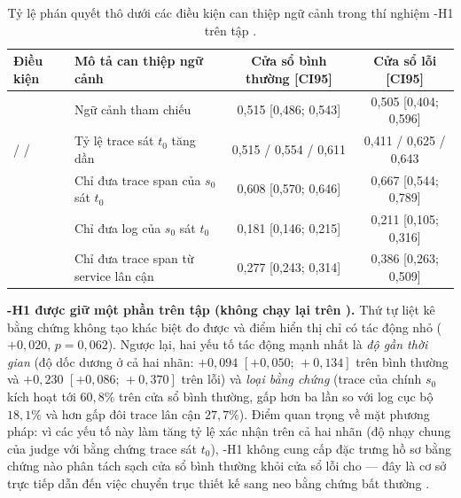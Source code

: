 \begin{table}[H]
  \centering
  \caption[Tỷ lệ TRUE\_ALERT thô theo điều kiện can thiệp H1 trên tập val]{Tỷ lệ phán quyết  thô dưới các điều kiện can thiệp ngữ cảnh trong thí nghiệm \hyp{H1} trên tập .}
  \label{tab:ch5-h1}
  \tblfont
  \tblsetup
  \setlength{\tabcolsep}{4pt}
  \begin{tabularx}{\linewidth}{|l|Y|c|c|}
    \hline
    \textbf{Điều kiện} & \textbf{Mô tả can thiệp ngữ cảnh} & \textbf{Cửa sổ bình thường [CI95]} & \textbf{Cửa sổ lỗi [CI95]} \\
    \hline
     & Ngữ cảnh  tham chiếu & 0,515 [0,486; 0,543] & 0,505 [0,404; 0,596] \\
    \hline
     /  /  & Tỷ lệ trace sát $t_0$ tăng dần & 0,515 / 0,554 / 0,611 & 0,411 / 0,625 / 0,643 \\
    \hline
     & Chỉ đưa trace span của $s_0$ sát $t_0$ & 0,608 [0,570; 0,646] & 0,667 [0,544; 0,789] \\
    \hline
     & Chỉ đưa log của $s_0$ sát $t_0$ & 0,181 [0,146; 0,215] & 0,211 [0,105; 0,316] \\
    \hline
     & Chỉ đưa trace span từ service lân cận & 0,277 [0,243; 0,314] & 0,386 [0,263; 0,509] \\
    \hline
  \end{tabularx}
\end{table}

\textbf{\hyp{H1} được giữ một phần trên tập  (không chạy lại trên ).} Thứ tự liệt kê bằng chứng không tạo khác biệt đo được và điểm hiển thị chỉ có tác động nhỏ ($+0{,}020$, $p = 0{,}062$). Ngược lại, hai yếu tố tác động mạnh nhất là \emph{độ gần thời gian} (độ dốc dương ở cả hai nhãn: $+0{,}094$ $[+0{,}050;\, +0{,}134]$ trên bình thường và $+0{,}230$ $[+0{,}086;\, +0{,}370]$ trên lỗi) và \emph{loại bằng chứng} (trace của chính $s_0$ kích hoạt  tới $60{,}8\%$ trên cửa sổ bình thường, gấp hơn ba lần so với log cục bộ $18{,}1\%$ và hơn gấp đôi trace lân cận $27{,}7\%$). Điểm quan trọng về mặt phương pháp: vì các yếu tố này làm tăng tỷ lệ xác nhận trên cả hai nhãn (độ nhạy chung của judge với bằng chứng trace sát $t_0$), \hyp{H1} không cung cấp đặc trưng hồ sơ bằng chứng nào phân tách sạch cửa sổ bình thường khỏi cửa sổ lỗi cho  — đây là cơ sở trực tiếp dẫn đến việc chuyển trục thiết kế sang neo bằng chứng bất thường .

